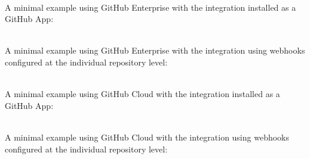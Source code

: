 \pagebreak
\noindent\\A minimal example using GitHub Enterprise with the \cxoneflow integration installed
as a GitHub App:

  
  
\pagebreak
\noindent\\A minimal example using GitHub Enterprise with the \cxoneflow integration using
webhooks configured at the individual repository level:





\pagebreak
\noindent\\A minimal example using GitHub Cloud with the \cxoneflow integration installed
as a GitHub App:


  
  
\pagebreak
\noindent\\A minimal example using GitHub Cloud with the \cxoneflow integration using
webhooks configured at the individual repository level:

